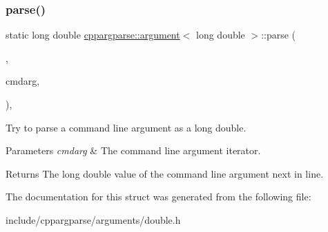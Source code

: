 \subsubsection{\texorpdfstring{parse()}{parse()}}
{\footnotesize\ttfamily static long double \hyperlink{structcppargparse_1_1argument}{cppargparse\+::argument}$<$ long double $>$\+::parse (\begin{DoxyParamCaption}\item[{const types\+::\+Command\+Line\+\_\+t \&}]{,  }\item[{const types\+::\+Command\+Line\+Argument\+\_\+t \&}]{cmdarg,  }\item[{const types\+::\+Command\+Line\+Arguments\+Map\+\_\+t \&}]{ }\end{DoxyParamCaption})\hspace{0.3cm}{\ttfamily [inline]}, {\ttfamily [static]}}



Try to parse a command line argument as a long double. 


\begin{DoxyParams}{Parameters}
{\em cmdarg} & The command line argument iterator.\\
\hline
\end{DoxyParams}
\begin{DoxyReturn}{Returns}
The long double value of the command line argument next in line. 
\end{DoxyReturn}


The documentation for this struct was generated from the following file\+:\begin{DoxyCompactItemize}
\item 
include/cppargparse/arguments/double.\+h\end{DoxyCompactItemize}
